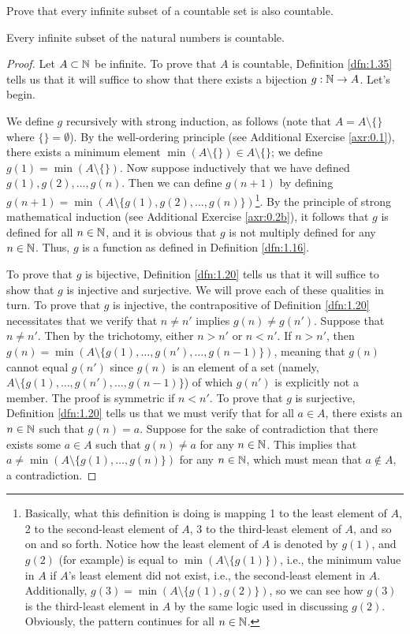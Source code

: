 \documentclass[../main.tex]{subfiles}
\begin{document}
\begin{exercise}\label{exr:1.37}
    Prove that every infinite subset of a countable set is also countable.
    \begin{lemma*}
        Every infinite subset of the natural numbers is countable.
        \begin{proof}
            Let $A\subset\mathbb{N}$ be infinite. To prove that $A$ is countable, Definition \ref{dfn:1.35} tells us that it will suffice to show that there exists a bijection $g:\mathbb{N}\to A$. Let's begin.\par
            We define $g$ recursively with strong induction, as follows (note that $A=A\setminus\{\}$ where $\{\}=\emptyset$). By the well-ordering principle (see Additional Exercise \ref{axr:0.1}), there exists a minimum element $\min(A\setminus\{\})\in A\setminus\{\}$; we define $g(1)=\min(A\setminus\{\})$. Now suppose inductively that we have defined $g(1),g(2),\dots,g(n)$. Then we can define $g(n+1)$ by defining $g(n+1)=\min(A\setminus\{g(1),g(2),\dots,g(n)\})$\footnote{Basically, what this definition is doing is mapping 1 to the least element of $A$, 2 to the second-least element of $A$, 3 to the third-least element of $A$, and so on and so forth. Notice how the least element of $A$ is denoted by $g(1)$, and $g(2)$ (for example) is equal to $\min(A\setminus\{g(1)\})$, i.e., the minimum value in $A$ if $A$'s least element did not exist, i.e., the second-least element in $A$. Additionally, $g(3)=\min(A\setminus\{g(1),g(2)\})$, so we can see how $g(3)$ is the third-least element in $A$ by the same logic used in discussing $g(2)$. Obviously, the pattern continues for all $n\in\mathbb{N}$.}. By the principle of strong mathematical induction (see Additional Exercise \ref{axr:0.2b}), it follows that $g$ is defined for all $n\in\mathbb{N}$, and it is obvious that $g$ is not multiply defined for any $n\in\mathbb{N}$. Thus, $g$ is a function as defined in Definition \ref{dfn:1.16}.\par
            To prove that $g$ is bijective, Definition \ref{dfn:1.20} tells us that it will suffice to show that $g$ is injective and surjective. We will prove each of these qualities in turn. To prove that $g$ is injective, the contrapositive of Definition \ref{dfn:1.20} necessitates that we verify that $n\neq n'$ implies $g(n)\neq g(n')$. Suppose that $n\neq n'$. Then by the trichotomy, either $n>n'$ or $n<n'$. If $n>n'$, then $g(n)=\min(A\setminus\{g(1),\dots,g(n'),\dots,g(n-1)\})$, meaning that $g(n)$ cannot equal $g(n')$ since $g(n)$ is an element of a set (namely, $A\setminus\{g(1),\dots,g(n'),\dots,g(n-1)\}$) of which $g(n')$ is explicitly not a member. The proof is symmetric if $n<n'$. To prove that $g$ is surjective, Definition \ref{dfn:1.20} tells us that we must verify that for all $a\in A$, there exists an $n\in\mathbb{N}$ such that $g(n)=a$. Suppose for the sake of contradiction that there exists some $a\in A$ such that $g(n)\neq a$ for any $n\in\mathbb{N}$. This implies that $a\neq\min(A\setminus\{g(1),\dots,g(n)\})$ for any $n\in\mathbb{N}$, which must mean that $a\notin A$, a contradiction.

\end{proof}
\end{lemma*}
\end{exercise}
\end{document}
